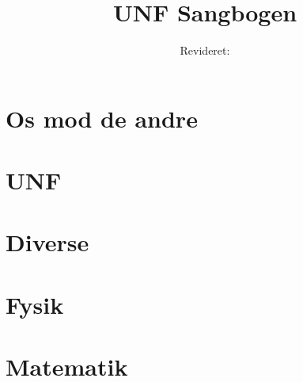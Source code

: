 \documentclass[12pt]{book}
\title{UNF Sangbogen}
\author{}
\date{Revideret:  \RevDate}
\begin{document}
\maketitle
\mainmatter
\ifWordBk
  \twocolumn
\fi


\onecolumn
\chapter*{Os mod de andre}
\twocolumn









\onecolumn
\chapter*{UNF}
\twocolumn






% 

\onecolumn
\chapter*{Diverse}
\twocolumn












\onecolumn
\chapter*{Fysik}
\twocolumn







\onecolumn
\chapter*{Matematik}
\twocolumn







\end{document}
